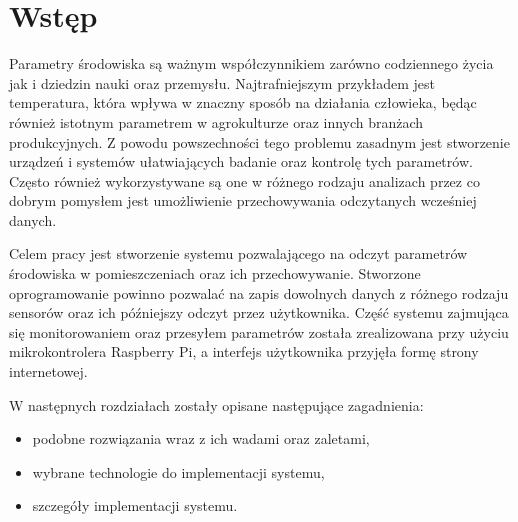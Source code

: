 \chapter{Wstęp}

Parametry środowiska są ważnym współczynnikiem zarówno codziennego życia jak
i dziedzin nauki oraz przemysłu. Najtrafniejszym przykładem jest temperatura, 
która wpływa w znaczny sposób na działania człowieka, będąc również istotnym
parametrem w agrokulturze oraz innych branżach produkcyjnych. Z powodu powszechności
tego problemu zasadnym jest stworzenie urządzeń i systemów ułatwiających badanie
oraz kontrolę tych parametrów. Często również wykorzystywane są one w różnego rodzaju
analizach przez co dobrym pomysłem jest umożliwienie przechowywania odczytanych
wcześniej danych.


Celem pracy jest stworzenie systemu pozwalającego na odczyt parametrów środowiska
w pomieszczeniach oraz ich przechowywanie. Stworzone oprogramowanie powinno pozwalać
na zapis dowolnych danych z różnego rodzaju sensorów oraz ich późniejszy odczyt
przez użytkownika. Część systemu zajmująca się monitorowaniem oraz przesyłem
parametrów została zrealizowana przy użyciu mikrokontrolera Raspberry Pi, a
interfejs użytkownika przyjęła formę strony internetowej. 

W następnych rozdziałach zostały opisane następujące zagadnienia:
\begin{itemize}
  \item podobne rozwiązania wraz z ich wadami oraz zaletami,
  \item wybrane technologie do implementacji systemu,
  \item szczegóły implementacji systemu.
\end{itemize}
